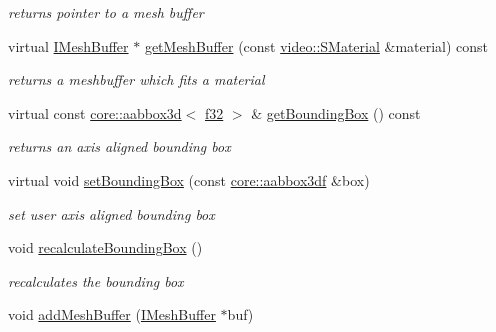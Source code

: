 \begin{DoxyCompactItemize}
\begin{DoxyCompactList}\small\item\em returns pointer to a mesh buffer \end{DoxyCompactList}\item 
virtual \hyperlink{classirr_1_1scene_1_1IMeshBuffer}{I\+Mesh\+Buffer} $\ast$ \hyperlink{structirr_1_1scene_1_1SMesh_a768eeba9148e949d6962bee08517a056}{get\+Mesh\+Buffer} (const \hyperlink{classirr_1_1video_1_1SMaterial}{video\+::\+S\+Material} \&material) const
\begin{DoxyCompactList}\small\item\em returns a meshbuffer which fits a material \end{DoxyCompactList}\item 
\mbox{\label{structirr_1_1scene_1_1SMesh_a379e330c863acdade37e65275903158d}} 
virtual const \hyperlink{classirr_1_1core_1_1aabbox3d}{core\+::aabbox3d}$<$ \hyperlink{namespaceirr_a0277be98d67dc26ff93b1a6a1d086b07}{f32} $>$ \& \hyperlink{structirr_1_1scene_1_1SMesh_a379e330c863acdade37e65275903158d}{get\+Bounding\+Box} () const
\begin{DoxyCompactList}\small\item\em returns an axis aligned bounding box \end{DoxyCompactList}\item 
\mbox{\label{structirr_1_1scene_1_1SMesh_a636e4df4054b2ed2911808cfb6df5cb3}} 
virtual void \hyperlink{structirr_1_1scene_1_1SMesh_a636e4df4054b2ed2911808cfb6df5cb3}{set\+Bounding\+Box} (const \hyperlink{namespaceirr_1_1core_adfc8fa01b30044c55f3332a1d6c1aa19}{core\+::aabbox3df} \&box)
\begin{DoxyCompactList}\small\item\em set user axis aligned bounding box \end{DoxyCompactList}\item 
\mbox{\label{structirr_1_1scene_1_1SMesh_a7a16bc83094ab242ae779baf817dc7f9}} 
void \hyperlink{structirr_1_1scene_1_1SMesh_a7a16bc83094ab242ae779baf817dc7f9}{recalculate\+Bounding\+Box} ()
\begin{DoxyCompactList}\small\item\em recalculates the bounding box \end{DoxyCompactList}\item 
void \hyperlink{structirr_1_1scene_1_1SMesh_a890e7506262b2ebaf45ff95c681452bd}{add\+Mesh\+Buffer} (\hyperlink{classirr_1_1scene_1_1IMeshBuffer}{I\+Mesh\+Buffer} $\ast$buf)

\end{DoxyCompactItemize}
